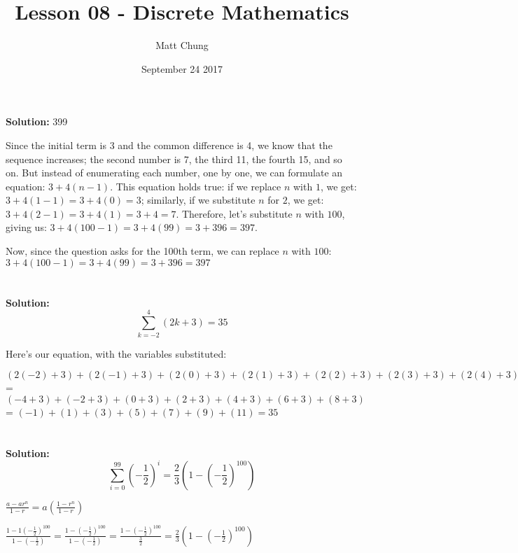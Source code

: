 \documentclass{article}
\title{Lesson 08 - Discrete Mathematics}
\author{Matt Chung}
\date{September 24 2017}
\begin{document}
\maketitle

\section{}
\textbf{Solution:} 399

Since the initial term is 3 and the common difference is 4, we know that the sequence increases; the second number is 7, the third 11, the fourth 15, and so on.  But instead of enumerating each number, one by one, we can formulate an equation: $3 + 4(n-1)$. This equation holds true: if we replace $n$ with $1$, we get: $3 + 4(1-1) = 3 + 4(0) = 3$; similarly, if we substitute $n$ for $2$, we get: $3 + 4(2-1) = 3 + 4(1) = 3 + 4 = 7$. Therefore, let's substitute $n$ with $100$, giving us: $3 + 4(100-1) = 3 + 4(99) = 3 + 396 = 397$.

Now, since the question asks for the 100th term, we can replace $n$ with $100$: $3 + 4(100-1) = 3 + 4(99) = 3 + 396 = 397$

\section{}

\textbf{Solution: } $$\sum_{k=-2}^{4} (2k + 3) = 35$$

\noindent Here's our equation, with the variables substituted:

\noindent $(2(-2) + 3) + (2(-1) + 3) + (2(0) + 3) + (2(1) + 3) + (2(2) + 3) + (2(3) + 3) + (2(4) + 3)$  = 
$(-4 + 3) + (-2 + 3) + (0 + 3) + (2 + 3) + (4 + 3) + (6 + 3) + (8 + 3)$  = $(-1) + (1) + (3) + (5) + (7) + (9) + (11) = 35$

\pagebreak

\section{}

\textbf{Solution: } $$\sum_{i=0}^{99} (-\frac{1}{2})^{i} = \frac{2}{3}(1 - (-\frac{1}{2})^{100})$$

$\frac{a-ar^{n}}{1 -r } = a(\frac{1-r^{n}}{1-r})$

$\frac{1-1(-\frac{1}{2})^{100}}{1 -(-\frac{1}{2}) } = \frac{1-(-\frac{1}{2})^{100}}{1 -(-\frac{1}{2}) } =\frac{1-(-\frac{1}{2})^{100}}{\frac{3}{2} } = \frac{2}{3}(1 - (-\frac{1}{2})^{100})$

\section{}
\end{document}
